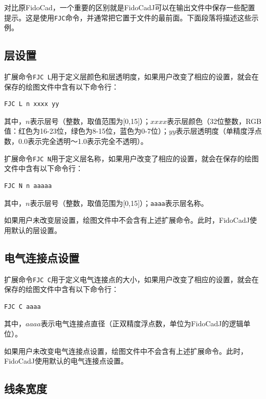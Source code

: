 \documentclass[10pt,a4paper,twoside]{scrreprt}
\begin{document}
对比原FidoCad，一个重要的区别就是FidoCadJ可以在输出文件中保存一些配置提示。这是使用\lstinline!FJC!命令，并通常把它置于文件的最前面。下面段落将描述这些示例。

\subsection{层设置}

扩展命令\lstinline!FJC L!用于定义层颜色和层透明度，如果用户改变了相应的设置，就会在保存的绘图文件中含有以下命令行：
\begin{lstlisting}
FJC L n xxxx yy
\end{lstlisting}
其中，$n$表示层号（整数，取值范围为[0,15]）；$xxxx$表示层颜色（32位整数，RGB值：红色为16-23位，绿色为8-15位，蓝色为0-7位）；$yy$表示层透明度（单精度浮点数，0.0表示完全透明～1.0表示完全不透明）。

扩展命令\lstinline!FJC N!用于定义层名称，如果用户改变了相应的设置，就会在保存的绘图文件中含有以下命令行：
\begin{lstlisting} 
FJC N n aaaaa
\end{lstlisting}
其中，$n$表示层号（整数，取值范围为[0,15]）；{\tt aaaa}表示层名称。

如果用户未改变层设置，绘图文件中不会含有上述扩展命令。此时，FidoCadJ使用默认的层设置。

\subsection{电气连接点设置}

扩展命令\lstinline!FJC C!用于定义电气连接点的大小，如果用户改变了相应的设置，就会在保存的绘图文件中含有以下命令行：
\begin{lstlisting}
FJC C aaaa
\end{lstlisting}
其中，$aaaa$表示电气连接点直径（正双精度浮点数，单位为FidoCadJ的逻辑单位）。

如果用户未改变电气连接点设置，绘图文件中不会含有上述扩展命令。此时，FidoCadJ使用默认的电气连接点设置。

\subsection{线条宽度}
\end{document}
